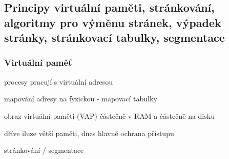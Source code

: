 \subsection{Principy virtuální paměti, stránkování, algoritmy pro výměnu stránek, výpadek stránky, stránkovací tabulky, segmentace}

\subsubsection*{Virtuální paměť}
\begin{pitemize}
	\item procesy pracují s virtuální adresou
	\item mapování adresy na fyzickou - mapovací tabulky
	\item obraz virtuální paměti (VAP) částečně v RAM a částečně na disku
	\item dříve iluze větší paměti, dnes hlavně ochrana přístupu
	\item stránkování / segmentace 
\end{pitemize}


